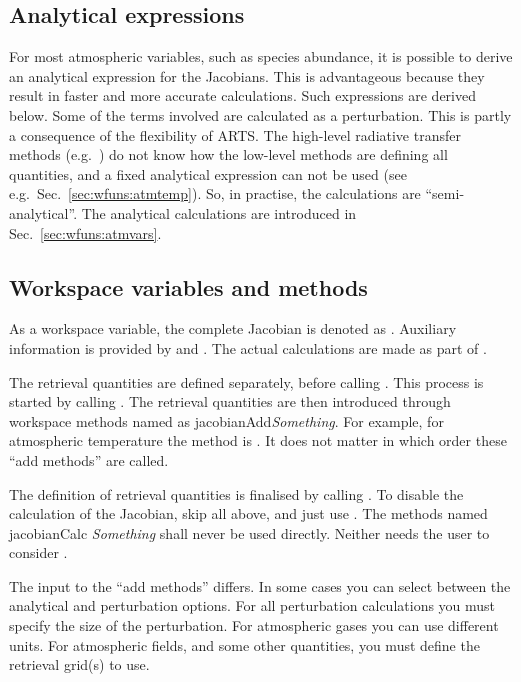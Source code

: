 \subsection{Analytical expressions}
\label{sec:wfuns:anal}
%
For most atmospheric variables, such as species abundance, it is possible to
derive an analytical expression for the Jacobians. This is advantageous because
they result in faster and more accurate calculations. Such expressions are
derived below. Some of the terms involved are calculated as a perturbation.
This is partly a consequence of the flexibility of ARTS. The high-level
radiative transfer methods (e.g.\ ) do not know
how the low-level methods are defining all quantities, and a fixed analytical
expression can not be used (see e.g.\ Sec.~\ref{sec:wfuns:atmtemp}). So, in
practise, the calculations are ``semi-analytical''. 
The analytical calculations are introduced in Sec.~\ref{sec:wfuns:atmvars}. 


\subsection{Workspace variables and methods}
\label{sec:wfuns:wsm}
%
As a workspace variable, the complete Jacobian is denoted as
. Auxiliary information is provided by
 and . The actual
calculations are made as part of .

The retrieval quantities are defined separately, before calling
. This process is started by calling .
The retrieval quantities are then introduced through workspace methods named as
jacobianAdd{\it Something}. For example, for atmospheric temperature the method
is . It does not matter in which order these
``add methods'' are called.

The definition of retrieval quantities is finalised by calling
. To disable the calculation of the Jacobian, skip all
above, and just use . The methods named jacobianCalc{\it
  Something} shall never be used directly. Neither needs the user to consider
.

The input to the ``add methods'' differs. In some cases you can select between
the analytical and perturbation options. For all perturbation calculations you
must specify the size of the perturbation. For atmospheric gases you can use
different units. For atmospheric fields, and some other quantities, you must
define the retrieval grid(s) to use.



